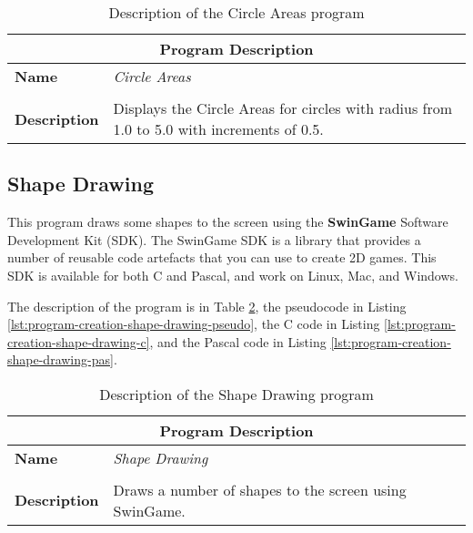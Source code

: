 \begin{table}[h]
\centering
\begin{tabular}{l|p{10cm}}
  \hline
  \multicolumn{2}{c}{\textbf{Program Description}} \\
  \hline
  \textbf{Name} & \emph{Circle Areas} \\
  \\
  \textbf{Description} & Displays the Circle Areas for circles with radius from 1.0 to 5.0 with increments of 0.5. \\
  \hline
\end{tabular}
\caption{Description of the Circle Areas program}
\label{tbl:program-creation-circle-area}
\end{table}


\clearpage


\clearpage
\subsection{Shape Drawing} %
\label{sub:shape_drawing}

This program draws some shapes to the screen using the \textbf{SwinGame} Software Development Kit (SDK). The SwinGame SDK is a library that provides a number of reusable code artefacts that you can use to create 2D games. This SDK is available for both C and Pascal, and work on Linux, Mac, and Windows.

The description of the program is in Table \ref{tbl:program-creation-shape-drawing}, the pseudocode in Listing \ref{lst:program-creation-shape-drawing-pseudo}, the C code in Listing \ref{lst:program-creation-shape-drawing-c}, and the Pascal code in Listing \ref{lst:program-creation-shape-drawing-pas}.

\begin{table}[h]
\centering
\begin{tabular}{l|p{10cm}}
  \hline
  \multicolumn{2}{c}{\textbf{Program Description}} \\
  \hline
  \textbf{Name} & \emph{Shape Drawing} \\
  \\
  \textbf{Description} & Draws a number of shapes to the screen using SwinGame. \\
  \hline
\end{tabular}
\caption{Description of the Shape Drawing program}
\label{tbl:program-creation-shape-drawing}
\end{table}

